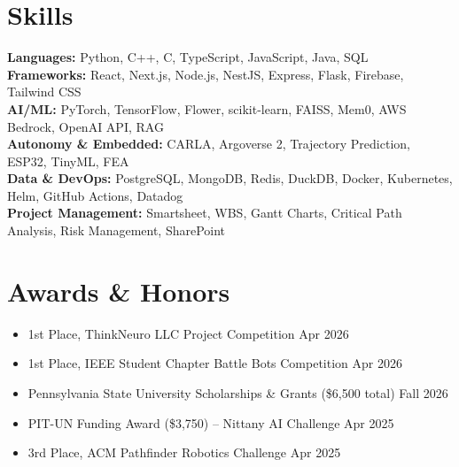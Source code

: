 \documentclass[11pt,a4paper]{article}
\newenvironment{details}{\begin{itemize}[leftmargin=1.4em, label=\textbullet, topsep=0pt, itemsep=0pt, parsep=0pt, partopsep=0pt]}{\end{itemize}}
\begin{document}
\section{Skills}
\textbf{Languages:} Python, C++, C, TypeScript, JavaScript, Java, SQL \\
\textbf{Frameworks:} React, Next.js, Node.js, NestJS, Express, Flask, Firebase, Tailwind CSS \\
\textbf{AI/ML:} PyTorch, TensorFlow, Flower, scikit-learn, FAISS, Mem0, AWS Bedrock, OpenAI API, RAG \\
\textbf{Autonomy \& Embedded:} CARLA, Argoverse 2, Trajectory Prediction, ESP32, TinyML, FEA \\
\textbf{Data \& DevOps:} PostgreSQL, MongoDB, Redis, DuckDB, Docker, Kubernetes, Helm, GitHub Actions, Datadog \\
\textbf{Project Management:} Smartsheet, WBS, Gantt Charts, Critical Path Analysis, Risk Management, SharePoint

\section{Awards \& Honors}
\begin{details}
\item 1st Place, ThinkNeuro LLC Project Competition \hfill Apr 2026
\item 1st Place, IEEE Student Chapter Battle Bots Competition \hfill Apr 2026
\item Pennsylvania State University Scholarships \& Grants (\$6,500 total) \hfill Fall 2026
\item PIT-UN Funding Award (\$3,750) – Nittany AI Challenge \hfill Apr 2025
\item 3rd Place, ACM Pathfinder Robotics Challenge \hfill Apr 2025
\end{details}
\end{document}
